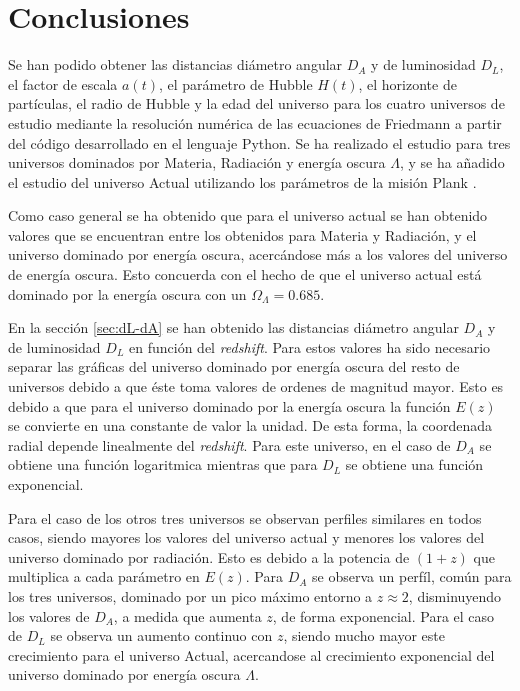 \documentclass[twoside]{article}
\begin{document}
		\section{Conclusiones}

			Se han podido obtener las distancias diámetro angular $D_A$ y de luminosidad $D_L$, el factor de escala $a(t)$, el parámetro de Hubble $H(t)$, el horizonte de partículas, el radio de Hubble y la edad del universo para los cuatro universos de estudio mediante la resolución numérica de las ecuaciones de Friedmann a partir del código desarrollado en el lenguaje Python. Se ha realizado el estudio para tres universos dominados por Materia, Radiación y energía oscura $\Lambda$, y se ha añadido el estudio del universo Actual utilizando los parámetros de la misión Plank \cite{Plank}.

			Como caso general se ha obtenido que para el universo actual se han obtenido valores que se encuentran entre los obtenidos para Materia y Radiación, y el universo dominado por energía oscura, acercándose más a los valores del universo de energía oscura. Esto concuerda con el hecho de que el universo actual está dominado por la energía oscura con un $\Omega_\Lambda = 0.685$.

			En la sección \ref{sec:dL-dA} se han obtenido las distancias diámetro angular $D_A$ y de luminosidad $D_L$ en función del \textit{redshift}. Para estos valores ha sido necesario separar las gráficas del universo dominado por energía oscura del resto de universos debido a que éste toma valores de ordenes de magnitud mayor. Esto es debido a que para el universo dominado por la energía oscura la función $E(z)$ se convierte en una constante de valor la unidad. De esta forma, la coordenada radial depende linealmente del \textit{redshift}. Para este universo, en el caso de $D_A$ se obtiene una función logaritmica mientras que para $D_L$ se obtiene una función exponencial.

			Para el caso de los otros tres universos se observan perfiles similares en todos casos, siendo mayores los valores del universo actual y menores los valores del universo dominado por radiación. Esto es debido a la potencia de $(1+z)$ que multiplica a cada parámetro en $E(z)$. Para $D_A$ se observa un perfíl, común para los tres universos, dominado por un pico máximo entorno a $z\approx2$, disminuyendo los valores de $D_A$, a medida que aumenta $z$, de forma exponencial. Para el caso de $D_L$ se observa un aumento continuo con $z$, siendo mucho mayor este crecimiento para el universo Actual, acercandose al crecimiento exponencial del universo dominado por energía oscura $\Lambda$.
\end{document}
